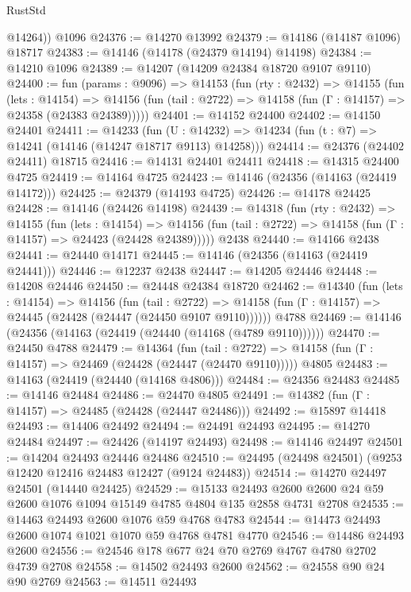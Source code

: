 \begin{lexlean}{RustStd}
\begin{coremodule}
        @14264))
    @1096
@24376 := @14270 @13992
@24379 := @14186 (@14187 @1096) @18717
@24383 := @14146 (@14178 (@24379 @14194) @14198)
@24384 := @14210 @1096
@24389 := @14207 (@14209 @24384 @18720 @9107 @9110)
@24400 := fun (params : @9096) =>
  @14153
    (fun (rty : @2432) =>
    @14155
      (fun (lets : @14154) =>
      @14156 (fun (tail : @2722) => @14158 (fun (Γ : @14157) => @24358 (@24383 @24389)))))
@24401 := @14152 @24400
@24402 := @14150 @24401
@24411 := @14233
    (fun (U : @14232) => @14234 (fun (t : @7) => @14241 (@14146 (@14247 @18717 @9113) @14258)))
@24414 := @24376 (@24402 @24411) @18715
@24416 := @14131 @24401 @24411
@24418 := @14315 @24400 @4725
@24419 := @14164 @4725
@24423 := @14146 (@24356 (@14163 (@24419 @14172)))
@24425 := @24379 (@14193 @4725)
@24426 := @14178 @24425
@24428 := @14146 (@24426 @14198)
@24439 := @14318
    (fun (rty : @2432) =>
    @14155
      (fun (lets : @14154) =>
      @14156 (fun (tail : @2722) => @14158 (fun (Γ : @14157) => @24423 (@24428 @24389)))))
    @2438
@24440 := @14166 @2438
@24441 := @24440 @14171
@24445 := @14146 (@24356 (@14163 (@24419 @24441)))
@24446 := @12237 @2438
@24447 := @14205 @24446
@24448 := @14208 @24446
@24450 := @24448 @24384 @18720
@24462 := @14340
    (fun (lets : @14154) =>
    @14156
      (fun (tail : @2722) =>
      @14158 (fun (Γ : @14157) => @24445 (@24428 (@24447 (@24450 @9107 @9110))))))
    @4788
@24469 := @14146 (@24356 (@14163 (@24419 (@24440 (@14168 (@4789 @9110))))))
@24470 := @24450 @4788
@24479 := @14364
    (fun (tail : @2722) => @14158 (fun (Γ : @14157) => @24469 (@24428 (@24447 (@24470 @9110)))))
    @4805
@24483 := @14163 (@24419 (@24440 (@14168 @4806)))
@24484 := @24356 @24483
@24485 := @14146 @24484
@24486 := @24470 @4805
@24491 := @14382 (fun (Γ : @14157) => @24485 (@24428 (@24447 @24486)))
@24492 := @15897 @14418
@24493 := @14406 @24492
@24494 := @24491 @24493
@24495 := @14270 @24484
@24497 := @24426 (@14197 @24493)
@24498 := @14146 @24497
@24501 := @14204 @24493 @24446 @24486
@24510 := @24495 (@24498 @24501) (@9253 @12420 @12416 @24483 @12427 (@9124 @24483))
@24514 := @14270 @24497 @24501 (@14440 @24425)
@24529 := @15133
    @24493
    @2600
    @2600
    @24
    @59
    @2600
    @1076
    @1094
    @15149
    @4785
    @4804
    @135
    @2858
    @4731
    @2708
@24535 := @14463 @24493 @2600 @1076 @59 @4768 @4783
@24544 := @14473 @24493 @2600 @1074 @1021 @1070 @59 @4768 @4781 @4770
@24546 := @14486 @24493 @2600
@24556 := @24546 @178 @677 @24 @70 @2769 @4767 @4780 @2702 @4739 @2708
@24558 := @14502 @24493 @2600
@24562 := @24558 @90 @24 @90 @2769
@24563 := @14511 @24493

\end{coremodule}
\end{lexlean}
